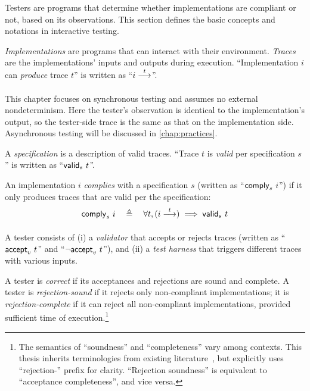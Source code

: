 Testers are programs that determine whether implementations are compliant or
not, based on its observations.  This section defines the basic concepts and
notations in interactive testing.

\begin{definition}
  {\em Implementations} are programs that can interact with their environment.
  {\em Traces} are the implementations' inputs and outputs during execution.
  ``Implementation $i$ can {\em produce} trace $t$'' is written as ``$\behaves i
  t$''.
\end{definition}

This chapter focuses on synchronous testing and assumes no external
nondeterminism.  Here the tester's observation is identical to the
implementation's output, so the tester-side trace is the same as that on the
implementation side.  Asynchronous testing will be discussed in
\autoref{chap:practices}.

\begin{definition}
  \label{def:compliance}
  A {\em specification} is a description of valid traces.  ``Trace $t$ is {\em
    valid} per specification $s$'' is written as ``$\mathsf{valid}_{s}~{t}$''.

  An implementation $i$ {\em complies} with a specification $s$ (written as
  ``$\mathsf{comply}_{s}~{i}$'') if it only produces traces that are valid per the
  specification:
  \[\complies s i\quad\triangleq\quad\forall t,(\behaves i t)\implies\valid s t\]
\end{definition}

\begin{definition}
  \label{def:tester}
  A tester consists of (i) a {\em validator} that accepts or rejects
  traces (written as ``$\mathsf{accept}_{v}~{t}$'' and ``$\neg\mathsf{accept}_{v}~{t}$''), and
  (ii) a {\em test harness} that triggers different traces with
  various inputs.

  A tester is {\em correct} if its acceptances and rejections are sound and
  complete.  A tester is {\em rejection-sound} if it rejects only non-compliant
  implementations; it is {\em rejection-complete} if it can reject all
  non-compliant implementations, provided sufficient time of
  execution.\footnote{The semantics of ``soundness'' and ``completeness'' vary
    among contexts.  This thesis inherits terminologies from existing
    literature~\cite{Tretmans}, but explicitly uses ``rejection-'' prefix for
    clarity.  ``Rejection soundness'' is equivalent to ``acceptance
    completeness'', and vice versa.}
\end{definition}

